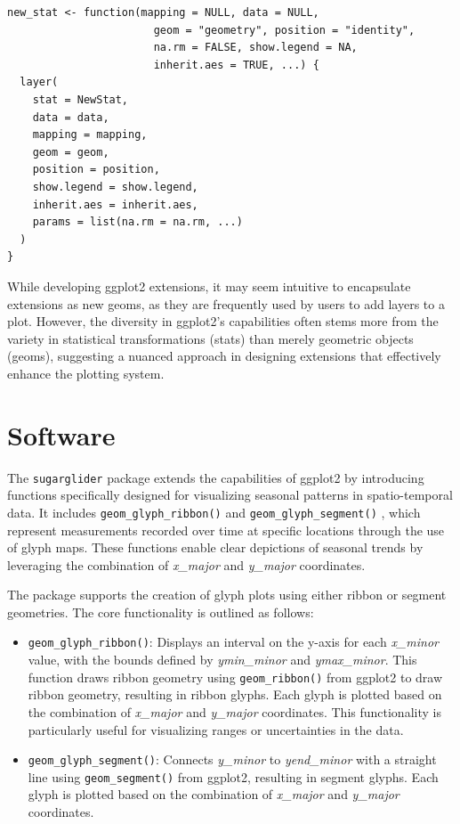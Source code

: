 \begin{verbatim}
new_stat <- function(mapping = NULL, data = NULL, 
                       geom = "geometry", position = "identity", 
                       na.rm = FALSE, show.legend = NA, 
                       inherit.aes = TRUE, ...) {
  layer(
    stat = NewStat, 
    data = data, 
    mapping = mapping, 
    geom = geom, 
    position = position, 
    show.legend = show.legend, 
    inherit.aes = inherit.aes, 
    params = list(na.rm = na.rm, ...)
  )
}
\end{verbatim}

While developing ggplot2 extensions, it may seem intuitive to encapsulate extensions as new geoms, as they are frequently used by users to add layers to a plot. However, the diversity in ggplot2's capabilities often stems more from the variety in statistical transformations (stats) than merely geometric objects (geoms), suggesting a nuanced approach in designing extensions that effectively enhance the plotting system.

\hypertarget{software}{%
\section{Software}\label{software}}

The \texttt{sugarglider} package extends the capabilities of ggplot2 by introducing functions specifically designed for visualizing seasonal patterns in spatio-temporal data. It includes \texttt{geom\_glyph\_ribbon()} and \texttt{geom\_glyph\_segment()} , which represent measurements recorded over time at specific locations through the use of glyph maps. These functions enable clear depictions of seasonal trends by leveraging the combination of \emph{x\_major} and \emph{y\_major} coordinates.

The package supports the creation of glyph plots using either ribbon or segment geometries. The core functionality is outlined as follows:

\begin{itemize}
\item
  \texttt{geom\_glyph\_ribbon()}: Displays an interval on the y-axis for each \emph{x\_minor} value, with the bounds defined by \emph{ymin\_minor} and \emph{ymax\_minor}. This function draws ribbon geometry using \texttt{geom\_ribbon()} from ggplot2 to draw ribbon geometry, resulting in ribbon glyphs. Each glyph is plotted based on the combination of \emph{x\_major} and \emph{y\_major} coordinates. This functionality is particularly useful for visualizing ranges or uncertainties in the data.
\item
  \texttt{geom\_glyph\_segment()}: Connects \emph{y\_minor} to \emph{yend\_minor} with a straight line using \texttt{geom\_segment()} from ggplot2, resulting in segment glyphs. Each glyph is plotted based on the combination of \emph{x\_major} and \emph{y\_major} coordinates.
\end{itemize}

